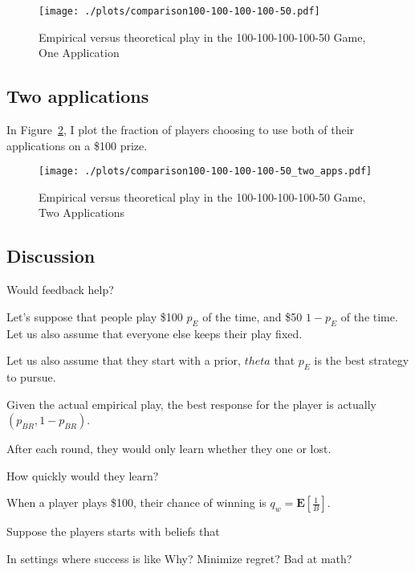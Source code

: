 \documentclass[11pt]{article}
\begin{document}
\begin{figure}
\caption{Empirical versus theoretical play in the 100-100-100-100-50
  Game, One Application} 
\label{game_play}
\begin{minipage}{0.85\linewidth}
\texttt{[image: ./plots/comparison100-100-100-100-50.pdf]}
\end{minipage} 
\end{figure} 

\subsection{Two applications} 

In Figure~\ref{game_play_2}, I plot the fraction of players choosing to use both of their applications on a \$100 prize. 

\begin{figure}
\caption{Empirical versus theoretical play in the 100-100-100-100-50
  Game, Two Applications} 
\label{game_play_2}
\begin{minipage}{0.85\linewidth}
\texttt{[image: ./plots/comparison100-100-100-100-50\_two\_apps.pdf]}
\end{minipage} 
\end{figure} 

\subsection{Discussion} 

Would feedback help? 

Let's suppose that people play \$100 $p_E$ of the time, and \$50 $1-p_E$ of the time.
Let us also assume that everyone else keeps their play fixed.  

Let us also assume that they start with a prior, $theta$ that $p_E$ is the best strategy to pursue. 

Given the actual empirical play, the best response for the player is actually $(p_{BR}, 1-p_{BR})$. 




After each round, they would only learn whether they one or lost. 

How quickly would they learn? 


When a player plays \$100, their chance of winning is $q_w = \mathbf{E}\left[\frac{1}{B}\right]$. 


Suppose the players starts with beliefs that 

In settings where success is like 
Why? 
Minimize regret? 
Bad at math? 
\end{document}
